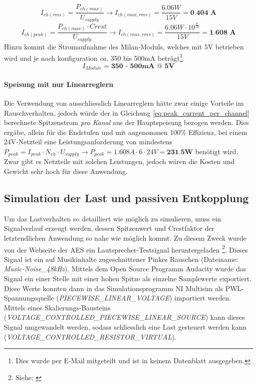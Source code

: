 \begin{equation}
	I_{ch(rms)} = \frac{P_{ch(max)}}{U_{supply}} \rightarrow I_{ch(max,rms)} = \frac{6.06W}{15V} = \textbf{0.404 A}
	\label{eq:rms_current_per_channel}
\end{equation}
\begin{equation}
	I_{ch(peak)} = \frac{P_{ch(max)} \cdot Crest}{U_{supply}}  \rightarrow I_{ch(max,rms)} = \frac{6.06W \cdot 10^{\frac{6}{10}}}{15V} = \textbf{1.608 A}
	\label{eq:peak_current_per_channel}
\end{equation}
Hinzu kommt die Stromaufnahme des Milan-Moduls, welches mit 5V betrieben wird und je nach konfiguration \textit{ca.} 350 bis 500mA beträgt\footnote{Dies wurde per E-Mail mitgeteilt und ist in keinem Datenblatt ausgegeben.}.
\begin{equation}
	I_{Module} = \textbf{350 - 500mA @ 5V}
\end{equation}
\paragraph{Speisung mit nur Linearreglern} Die Verwendung von ausschliesslich Linearreglern hätte zwar einige Vorteile im Rauschverhalten, jedoch würde der in Gleichung \ref{eq:peak_current_per_channel} berechnete Spitzenstrom \textit{pro Kanal} aus der Hauptspeisung bezogen werden. Dies ergäbe, allein für die Endstufen und mit angenommen 100\% Effizienz, bei einem 24V-Netzteil eine Leistungsanforderung von mindestens $P_{peak} = I_{peak} \cdot N_{ch} \cdot U_{supply} \rightarrow P_{peak} = 1.608A \cdot 6 \cdot 24V = \textbf{231.5W}$ benötigt wird. Zwar gibt es Netzteile mit solchen Leistungen, jedoch wären die Kosten und Gewicht sehr hoch für diese Anwendung.
\subsection{Simulation der Last und passiven Entkopplung}
Um das Lastverhalten so detailliert wie möglich zu simulieren, muss ein Signalverlauf erzeugt werden, dessen Spitzenwert und Crestfaktor der letztendlichen Anwendung so nahe wie möglich kommt. Zu diesem Zweck wurde von der Webseite der AES ein Lautsprecher-Testsignal heruntergeladen \footnote{Siehe: \cite{aes75}}. Dieses Signal ist ein auf Musikinhalte zugeschnittener Pinkes Rauschen (Dateiname: \textit{Music-Noise\_48kHz}). Mittels dem Open Source Programm Audacity wurde das Signal ein einer Stelle mit einer hohen Spitze als einzelne Samplewerte exportiert. Diese Werte konnten dann in das Simulationsprogramm NI Multisim als PWL-Spannungsquelle (\textit{PIECEWISE\_LINEAR\_VOLTAGE}) importiert werden. Mittels eines Skalierungs-Bausteins (\textit{VOLTAGE\_CONTROLLED\_PIECEWISE\_LINEAR\_SOURCE}) kann dieses Signal umgewandelt werden, sodass schliesslich eine Last gesteuert werden kann (\textit{VOLTAGE\_CONTROLLED\_RESISTOR\_VIRTUAL}). 
